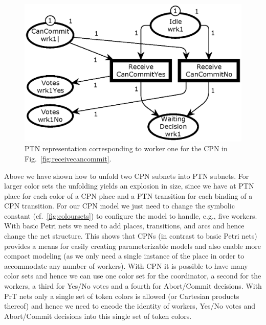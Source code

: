 \begin{figure}[t]
\centering
\includegraphics[scale=.45]{figures/PTReceiveCanCommit.eps}
\caption{PTN representation corresponding to worker one for the CPN in Fig.~\ref{fig:receivecancommit}.}
\label{fig:receivecancommitunfold}
\end{figure}


Above we have shown how to unfold two CPN subnets into PTN subnets.
For larger color sets the unfolding yields an explosion in size, since
we have at PTN place for each color of a CPN place and a PTN
transition for each binding of a CPN transition. For our CPN model we
just need to change the symbolic constant 
(cf.~\ref{fig:coloursets}) to configure the model to handle, e.g.,
five workers. With basic Petri nets we need to add places,
transitions, and arcs and hence change the net structure. This shows
that CPNs (in contrast to basic Petri nets) provides a means for
easily creating parameterizable models and also enable more compact
modeling (as we only need a single instance of the 
place in order to accommodate any number of workers). With CPN it is
possible to have many color sets and hence we can use one color set
for the coordinator, a second for the workers, a third for Yes/No
votes and a fourth for Abort/Commit decisions. With PrT nets only a
single set of token colors is allowed (or Cartesian products thereof)
and hence we need to encode the identity of workers, Yes/No votes and
Abort/Commit decisions into this single set of token colors.

